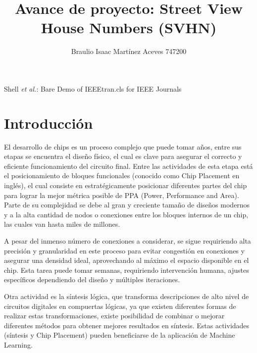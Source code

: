 \documentclass[journal]{IEEEtran}
\begin{document}
\title{Avance de proyecto: Street View House Numbers (SVHN)}

\author {Braulio Isaac Martínez Aceves 747200
        }%
        
{Shell \MakeLowercase{\textit{et al.}}: Bare Demo of IEEEtran.cls for IEEE Journals}

\maketitle


\section{Introducción}

El desarrollo de chips es un proceso complejo que puede tomar años, entre sus etapas se encuentra el diseño físico, el cual es clave para asegurar el correcto y eficiente funcionamiento del circuito final. Entre las actividades de esta etapa está el posicionamiento de bloques funcionales (conocido como Chip Placement en inglés), el cual consiste en estratégicamente posicionar diferentes partes del chip para lograr la mejor métrica posible de PPA (Power, Performance and Area). Parte de su complejidad se debe al gran y creciente tamaño de diseños modernos y a la alta cantidad de nodos o conexiones entre los bloques internos de un chip, las cuales van hasta miles de millones.

A pesar del inmenso número de conexiones a considerar, se sigue requiriendo alta precisión y granularidad en este proceso para evitar congestión en conexiones y asegurar una densidad ideal, aprovechando al máximo el espacio disponible en el chip. Esta tarea puede tomar semanas, requiriendo intervención humana, ajustes específicos dependiendo del diseño y múltiples iteraciones.

Otra actividad es la síntesis lógica, que transforma descripciones de alto nivel de circuitos digitales en compuertas lógicas, ya que existen diferentes formas de realizar estas transformaciones, existe posibilidad de combinar o mejorar diferentes métodos para obtener mejores resultados en síntesis. Estas actividades (síntesis y Chip Placement) pueden beneficiarse de la aplicación de Machine Learning.
\end{document}
